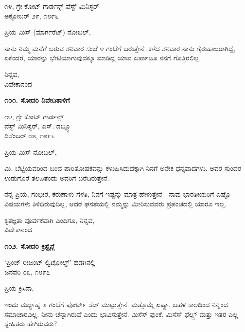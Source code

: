 \begin{flushright}
೧೪, ಗ್ರೇ ಕೋಟ್ ಗಾರ್ಡನ್ಸ್ ವೆಸ್ಟ್ ಮಿನಿಸ್ಟರ್\\ಅಕ್ಟೋಬರ್ ೨೯, ೧೮೯೬
\end{flushright}

ಪ್ರಿಯ ಮಿಸ್ (ಮಾರ್ಗರೆಟ್) ನೋಬಲ್,

ನಾನು ನಿಮ್ಮ ಮನೆಗೆ ಬರುವ ಶನಿವಾರ ಸಂಜೆ ೪ ಗಂಟೆಗೆ ಬರುತ್ತೇನೆ. ಕಳೆದ ಶನಿವಾರ ನಾನು ಗೈರುಹಾಜರಾಗಿದ್ದೆ, ಏಕೆಂದರೆ, ಯಾರನ್ನು ಭೇಟಿಯಾಗುವುದಕ್ಕೂ ಮಾಡಿದ್ದ ಯಾವ ಏರ್ಪಾಟೂ ನನಗೆ ಗೊತ್ತಿರಲಿಲ್ಲ.

\begin{flushright}
ನಿನ್ನವ,\\ವಿವೇಕಾನಂದ
\end{flushright}

\begin{center}
\textbf{೧೦೧. ಸೋದರಿ ನಿವೇದಿತಾಳಿಗೆ}
\end{center}

\begin{flushright}
೧೪, ಗ್ರೇ ಕೋಟ್ ಗಾರ್ಡನ್ಸ್\\ವೆಸ್ಟ್ ಮಿನಿಸ್ಟರ್, ಎಸ್. ಡಬ್ಲ್ಯೂ\\ಡಿಸೆಂಬರ್ ೦೫, ೧೮೯೬
\end{flushright}

ಪ್ರಿಯ ಮಿಸ್ ನೋಬಲ್,

ಮಿ. ಬೆಟ್ಟಿಯವರಿಂದ ಬಂದ ಪಾರಿತೋಷಕವನ್ನು ಕಳುಹಿಸಿದುದಕ್ಕಾಗಿ ನಿನಗೆ ಅನೇಕ ಧನ್ಯವಾದಗಳು. ಅವರ ಸುಂದರ ಉಡುಗೊರೆ ತಲಪಿತೆಂದು ಅವರಿಗೆ ಬರೆದಿರುತ್ತೇನೆ.

ನನ್ನ ಪ್ರಿಯ, ಗಂಭೀರ, ಕರುಣಾಳು ಗೆಳತಿ, ನಿನಗೆ ಇಷ್ಟನ್ನು ಮಾತ್ರ ಹೇಳುತ್ತೇನೆ - ನಾವು ಭಾರತೀಯರಿಗೆ ಎಷ್ಟೊ ವಿಷಯಗಳು ತಿಳಿದಿರುವುದಿಲ್ಲ, ಆದರೆ ಘನತೆಯಲ್ಲಿ ನಮ್ಮನ್ನು ಮೀರಿಸುವವರು ಪ್ರಪಂಚದಲ್ಲಿ ಯಾರೂ ಇಲ್ಲ.

\begin{flushright}
ಕೃತಜ್ಞತಾ ಪೂರ್ವಕವಾಗಿ ಎಂದಿಗೂ, ನಿನ್ನವ,\\ವಿವೇಕಾನಂದ
\end{flushright}

\begin{center}
\textbf{೧೦೨. ಸೋದರಿ ಕ್ರಿಸ್ಟೈನ್ಗೆ}
\end{center}

\begin{flushright}
‘ಪ್ರಿಂಜ್ ರೀಜಂಟ್ ಲ್ವಿಟ್ಪೋಲ್ಡ್’ ಹಡಗಿನಲ್ಲಿ\\ಜನವರಿ ೦೩, ೧೮೯೭
\end{flushright}

ಪ್ರಿಯ ಕ್ರಿಸಿನಾ,

ಇಂದು ಮಧ್ಯಾಹ್ನ ೨ ಗಂಟೆಗೆ ಪೋರ್ಟ್ ಸೆಡ್ ಮುಟ್ಟುತ್ತೇನೆ. ಮತ್ತೊಮ್ಮೆ ಏಷ್ಯಾ. ಬಹಳ ಕಾಲದಿಂದ ನಿನ್ನಿಂದ ಸಮಾಚಾರವಿಲ್ಲ. ನೀನು ಚೆನ್ನಾಗಿರುವೆ ಎಂದು ಭಾವಿಸುತ್ತೇನೆ. ಮಿಸೆಸ್ ಫುಂಕೆ, ಮಿಸೆಸ್ ಫೆಲ್ಪ್ಸ್ ಮತ್ತು ಇತರ ಎಲ್ಲ ಸ್ನೇಹಿತರು ಹೇಗಿರುವರು?

